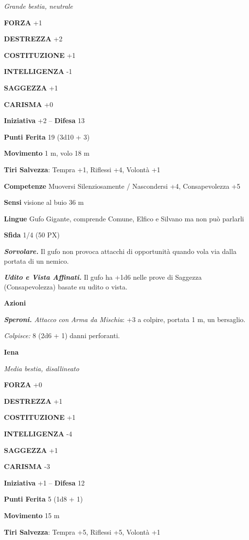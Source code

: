 \begin{multicols}{2}
\textit{Grande bestia, neutrale}

\textbf{FORZA} +1

\textbf{DESTREZZA} +2

\textbf{COSTITUZIONE} +1

\textbf{INTELLIGENZA} -1

\textbf{SAGGEZZA} +1

\textbf{CARISMA} +0

\textbf{Iniziativa} +2 -- \textbf{Difesa} 13

\textbf{Punti Ferita} 19 (3d10 + 3)

\textbf{Movimento} 1 m, volo 18 m

\textbf{Tiri Salvezza}: Tempra +1, Riflessi +4, Volontà +1

\textbf{Competenze} Muoversi Silenziosamente / Nascondersi +4, Consapevolezza +5

\textbf{Sensi} visione al buio 36 m

\textbf{Lingue} Gufo Gigante, comprende Comune, Elfico e Silvano ma non può parlarli

\textbf{Sfida} 1/4 (50 PX)

\textit{\textbf{Sorvolare.}} Il gufo non provoca attacchi di opportunità quando vola via dalla portata di un nemico.

\textit{\textbf{Udito e Vista Affinati.}} Il gufo ha +1d6 nelle prove di Saggezza (Consapevolezza) basate su udito o vista.

\textbf{Azioni}

\textit{\textbf{Speroni.} Attacco con Arma da Mischia}: +3 a colpire, portata 1 m, un bersaglio.

\textit{Colpisce:} 8 (2d6 + 1) danni perforanti.

\medskip\textbf{Iena}

\textit{Media bestia, disallineato}

\textbf{FORZA} +0

\textbf{DESTREZZA} +1

\textbf{COSTITUZIONE} +1

\textbf{INTELLIGENZA} -4

\textbf{SAGGEZZA} +1

\textbf{CARISMA} -3

\textbf{Iniziativa} +1 -- \textbf{Difesa} 12

\textbf{Punti Ferita} 5 (1d8 + 1)

\textbf{Movimento} 15 m

\textbf{Tiri Salvezza}: Tempra +5, Riflessi +5, Volontà +1


\end{multicols}
